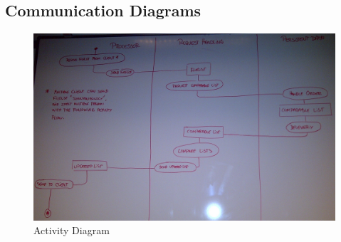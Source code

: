 \subsection{Communication Diagrams}
\begin{figure}[h!]
  \includegraphics[width=\textwidth,natwidth=2456,natheight=1522]{illustrations/ActivityDiagram.jpg}
  \caption{Activity Diagram}
  \label{activitydiagram}
\end{figure}
\newpage